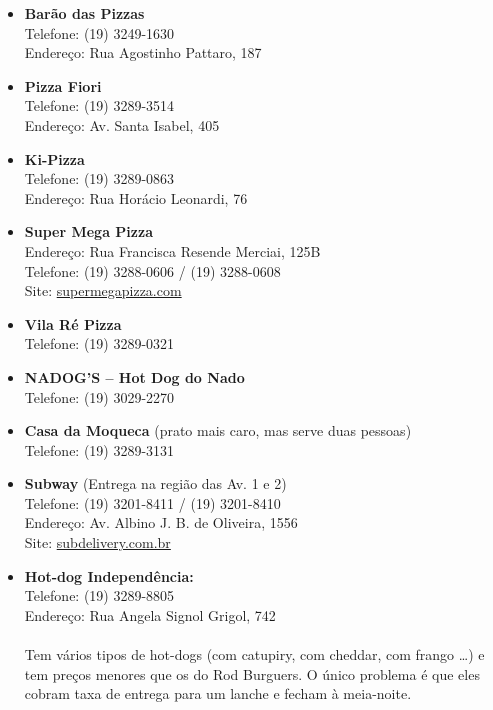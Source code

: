 \begin{itemize}
    \item   \textbf{Barão das Pizzas}
        \\Telefone: (19) 3249-1630
        \\Endereço: Rua Agostinho Pattaro, 187

    \item   \textbf{Pizza Fiori}
        \\Telefone: (19) 3289-3514
        \\Endereço: Av. Santa Isabel, 405

    \item   \textbf{Ki-Pizza}
        \\Telefone: (19) 3289-0863
        \\Endereço: Rua Horácio Leonardi, 76

    \item   \textbf{Super Mega Pizza}
        \\Endereço: Rua Francisca Resende Merciai, 125B
        \\Telefone: (19) 3288-0606 / (19) 3288-0608
        \\Site: \url{supermegapizza.com}

    \item   \textbf{Vila Ré Pizza}
        \\Telefone: (19) 3289-0321

    \item   \textbf{NADOG'S -- Hot Dog do Nado}
        \\Telefone: (19) 3029-2270

    \item   \textbf{Casa da Moqueca} (prato mais caro, mas serve duas pessoas)
        \\Telefone: (19) 3289-3131

    \item   \textbf{Subway} (Entrega na região das Av. 1 e 2)
        \\Telefone: (19) 3201-8411 / (19) 3201-8410
        \\Endereço: Av. Albino J. B. de Oliveira, 1556
        \\Site: \url{subdelivery.com.br}


    \item   \textbf{Hot-dog Independência:}
        \\Telefone: (19) 3289-8805
        \\Endereço: Rua Angela Signol Grigol, 742
        \\\\
        Tem vários tipos de hot-dogs (com catupiry, com cheddar, com frango
        {\dots}) e tem preços menores que os do Rod Burguers. O único problema é
        que eles cobram taxa de entrega para um lanche e fecham à meia-noite.


\end{itemize}

